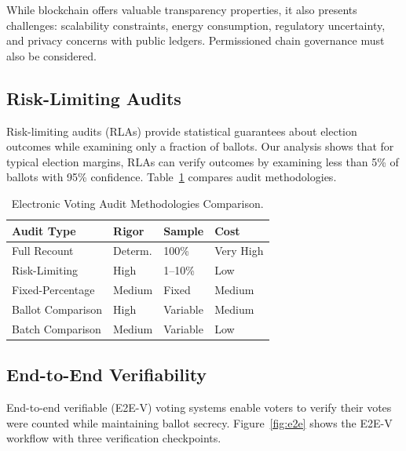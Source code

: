 \documentclass[sigconf,nonacm]{acmart}
\begin{document}
While blockchain offers valuable transparency properties, it also presents challenges:
scalability constraints, energy consumption, regulatory uncertainty, and privacy
concerns with public ledgers. Permissioned chain governance must also be considered.

\subsection{Risk-Limiting Audits}

Risk-limiting audits (RLAs) provide statistical guarantees about election outcomes while
examining only a fraction of ballots. Our analysis shows that for typical election
margins, RLAs can verify outcomes by examining less than 5\% of ballots with 95\%
confidence. Table~\ref{tab:audit} compares audit methodologies.

\begin{table}[h]
\caption{Electronic Voting Audit Methodologies Comparison.}
\label{tab:audit}
\small
\begin{tabularx}{\columnwidth}{@{}p{2.2cm}p{1.4cm}p{1.2cm}X@{}}
\toprule
\textbf{Audit Type} & \textbf{Rigor} & \textbf{Sample} & \textbf{Cost} \\
\midrule
Full Recount       & Determ. & 100\%   & Very High \\
Risk-Limiting      & High          & 1--10\% & Low \\
Fixed-Percentage   & Medium        & Fixed   & Medium \\
Ballot Comparison  & High          & Variable & Medium \\
Batch Comparison   & Medium        & Variable & Low \\
\bottomrule
\end{tabularx}
\end{table}

\subsection{End-to-End Verifiability}

End-to-end verifiable (E2E-V) voting systems enable voters to verify their votes were
counted while maintaining ballot secrecy. Figure~\ref{fig:e2e} shows the E2E-V workflow
with three verification checkpoints.
\end{document}
